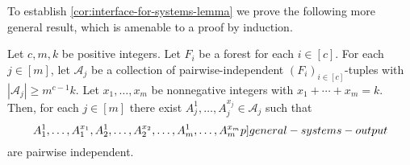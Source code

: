\documentclass{patmorin}
\newcommand{\pat}[1]{\textcolor{Blue}{[Pat: #1]}}
\newcommand{\piotr}[1]{\textcolor{red}{Piotr: #1}}
\begin{document}
To establish \cref{cor:interface-for-systems-lemma} we prove the following more general result, which is amenable to a proof by induction.


\begin{lem}\label{cor:general-systems-lemma}
Let $c,m,k$ be positive integers.
Let $F_i$ be a forest for each $i\in[c]$.
For each $j\in [m]$,
let $\mathcal{A}_j$ be a collection of pairwise-independent $(F_i)_{i\in[c]}$-tuples with $|\mathcal{A}_j|\geq m^{c-1}k$.
Let $x_1,\ldots,x_m$ be nonnegative integers with $x_1+\cdots+x_m=k$.
Then, for each $j\in[m]$ there exist 
$A_j^{1},\ldots,A_j^{x_j}\in \mathcal{A}_j$ such that 
\begin{equation}
A_1^{1},\ldots,A_1^{x_1},A_2^{1},\ldots,A_2^{x_2},\ldots,A_m^{1},\ldots,A_m^{x_m}  \label[p]{general-systems-output}
\end{equation}
are pairwise independent.
\end{lem}
\end{document}
